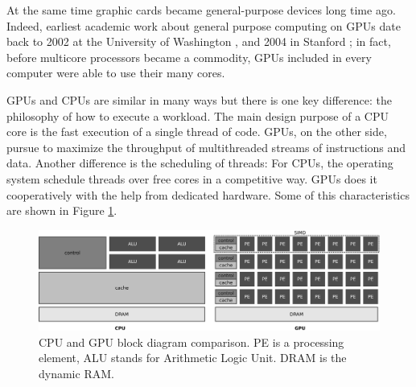 \documentclass{article}
\begin{document}
At the same time graphic cards became general-purpose devices long
time ago. Indeed, earliest academic work about general purpose
computing on GPUs date back to 2002 at the University of Washington
\cite{Thompson:2002:UMG:774861.774894}, and 2004 in Stanford
\cite{Buck:2004:BGS:1015706.1015800}; in fact, before multicore
processors became a commodity, GPUs included in every computer were
able to use their many cores.


GPUs and CPUs are similar in many ways but there is one key
difference: the philosophy of how to execute a workload. The main
design purpose of a CPU core is the fast execution of a single thread of
code. GPUs, on the other side, pursue to maximize the throughput of
multithreaded streams of instructions and data. Another difference is the scheduling of threads: For
CPUs, the operating system schedule threads over free cores in a
competitive way. GPUs does it cooperatively with the help from
dedicated hardware. Some of this characteristics are shown in 
Figure \ref{fig:cpu-gpu}.

\begin{figure}[!ht]
\centering
\includegraphics[width=\textwidth]{cpu-gpu}
\caption{CPU and GPU block diagram comparison. PE is a processing
  element, ALU stands for Arithmetic Logic Unit. DRAM is the dynamic RAM.}
\label{fig:cpu-gpu}
\end{figure}

\end{document}
